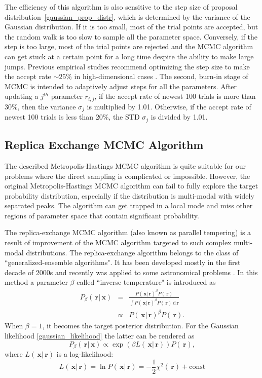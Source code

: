 \documentclass[preprint2]{aastex}
\newcommand{\bfr}{\,\mathbf{r}}
\newcommand{\bfx}{\,\mathbf{x}}
\newcommand{\ud}{\,\mathrm{d}}
\begin{document}
The efficiency of this algorithm is also sensitive to the step size of proposal distribution~\eqref{gaussian_prop_distr}, which is determined by the variance of the Gaussian distribution. If it is too small, most of the trial points are accepted, but the random walk is too slow to sample all the parameter space. Conversely, if the step is too large, most of the trial points are rejected and the MCMC algorithm can get stuck at a certain point for a long time despite the ability to make large jumps. Previous empirical studies recommend optimizing the step size to make the accept rate $\sim 25$\% in high-dimensional cases \citep[see references in][]{Gregory2005}. The second, burn-in stage of MCMC is intended to adaptively adjust steps for all the parameters. After updating a $j^{th}$ parameter $r_{i,j}$, if the accept rate of newest 100 trials is more than 30\%, then the variance $\sigma_j$ is multiplied by 1.01. Otherwise, if the accept rate of newest 100 trials is less than 20\%, the STD $\sigma_j$ is divided by 1.01. 



\subsection{Replica Exchange MCMC Algorithm}

The described Metropolis-Hastings MCMC algorithm is quite suitable for our problems where the direct sampling is complicated or impossible. However, the original Metropolis-Hastings MCMC algorithm can fail to fully explore the target probability distribution, especially if the distribution is multi-modal with widely separated peaks. The algorithm can get trapped in a local mode and miss other regions of parameter space that contain significant probability. 

The replica-exchange MCMC algorithm (also known as parallel tempering) is a result of improvement of the MCMC algorithm targeted to such complex multi-modal distributions. The replica-exchange algorithm belongs to the class of ``generalized-ensemble algorithms". It has been developed mostly in the first decade of 2000s and recently was applied to some astronomical problems \citep{Gregory2005,Varghese_etal2011,Benneke_Seager2012}. In this method a parameter $\beta$ called ``inverse temperature" is introduced as
\begin{eqnarray}
  \label{post_distr_beta}
  P_\beta(\bfr|\bfx) &=&  \frac{P(\bfx|\bfr)^\beta P(\bfr)}{\int P(\bfx|\bfr)^\beta P(\bfr) \ud \bfr} \nonumber \\
                     &\propto & P(\bfx|\bfr)^\beta P(\bfr)  .
\end{eqnarray}
When $\beta=1$, it becomes the target posterior distribution. For the Gaussian likelihood \eqref{gaussian_likelihood} the latter can be rendered as
\begin{equation}
      P_\beta(\bfr|\bfx) \propto \exp \left( \beta L(\bfx|\bfr) \right) P(\bfr),
\end{equation}
where $L(\bfx|\bfr)$ is a log-likelihood:
\begin{equation}
  L(\bfx|\bfr) = \ln P(\bfx|\bfr) = -\frac{1}{2}\chi^2(\bfr) + \mathrm{const}
\end{equation}
\end{document}
